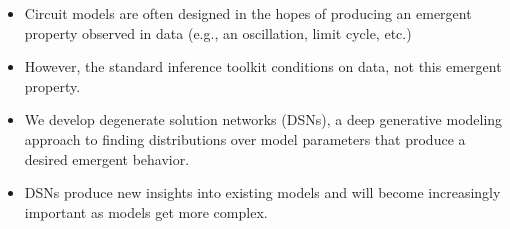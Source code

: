 \documentclass[landscape]{article}
\newcommand{\mysection}[1]{{\color[rgb]{.6,0,0}{\section*{{\HUGE #1}
        {\leaders\hrule height .2ex\hfill\kern0pt}}}}}
\begin{document}
\setlength{\columnsep}{1in}
\begin{multicols*}{4}


\mysection{Motivation}
\LARGE
\begin{itemize}
\item Circuit models are often designed in the hopes of producing an emergent property observed in data (e.g., an oscillation, limit cycle, etc.)
\item However, the standard inference toolkit conditions on data, not this emergent property.
\item We develop degenerate solution networks (DSNs), a deep generative modeling approach to finding distributions over model parameters that produce a desired emergent behavior.
\item DSNs produce new insights into existing models and will become increasingly important as models get more complex.
\end{itemize}
\end{multicols*}
\end{document}
